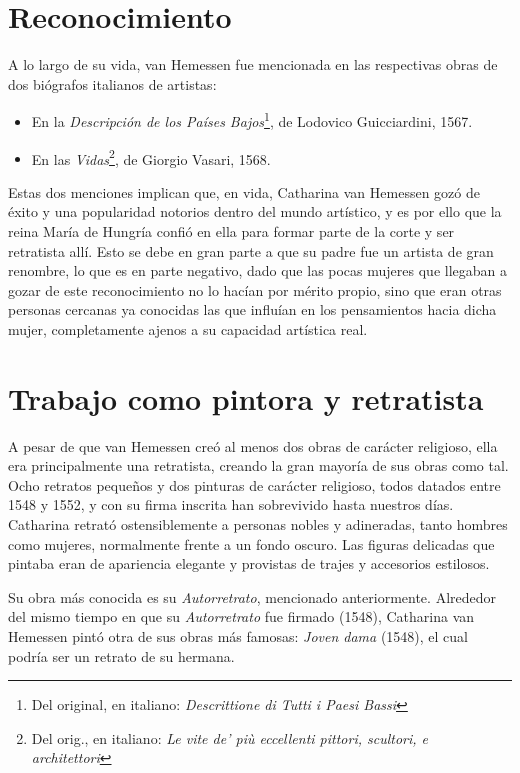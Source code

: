 \documentclass[12pt]{book}
\begin{document}
\section{Reconocimiento}

A lo largo de su vida, van Hemessen fue mencionada en las respectivas obras de dos biógrafos italianos de artistas:
\begin{itemize}
	\item En la \textit{Descripción de los Países Bajos}\footnote{Del original, en italiano: \textit{Descrittione di Tutti i Paesi Bassi}}, de Lodovico Guicciardini, 1567.
	\item En las \textit{Vidas}\footnote{Del orig., en italiano: \textit{Le vite de' più eccellenti pittori, scultori, e architettori}}, de Giorgio Vasari, 1568.
\end{itemize}

Estas dos menciones implican que, en vida, Catharina van Hemessen gozó de éxito y una popularidad notorios dentro del mundo artístico, y es por ello que la reina María de Hungría confió en ella para formar parte de la corte y ser retratista allí. Esto se debe en gran parte a que su padre fue un artista de gran renombre, lo que es en parte negativo, dado que las pocas mujeres que llegaban a gozar de este reconocimiento no lo hacían por mérito propio, sino que eran otras personas cercanas ya conocidas las que influían en los pensamientos hacia dicha mujer, completamente ajenos a su capacidad artística real.

\section{Trabajo como pintora y retratista}

A pesar de que van Hemessen creó al menos dos obras de carácter religioso, ella era principalmente una retratista, creando la gran mayoría de sus obras como tal. Ocho retratos pequeños y dos pinturas de carácter religioso, todos datados entre 1548 y 1552, y con su firma inscrita han sobrevivido hasta nuestros días. Catharina retrató ostensiblemente a personas nobles y adineradas, tanto hombres como mujeres, normalmente frente a un fondo oscuro. Las figuras delicadas que pintaba eran de apariencia elegante y provistas de trajes y accesorios estilosos.\bigskip

Su obra más conocida es su \textit{Autorretrato}, mencionado anteriormente. Alrededor del mismo tiempo en que su \textit{Autorretrato} fue firmado (1548), Catharina van Hemessen pintó otra de sus obras más famosas: \textit{Joven dama} (1548), el cual podría ser un retrato de su hermana.\bigskip
\end{document}
